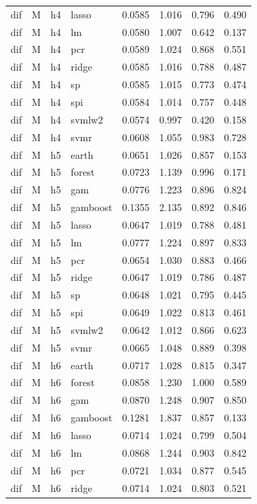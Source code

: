 \begin{ThreePartTable}
\begin{longtable}[t]{llclcccc}
dif & M & h4 & lasso & 0.0585 & 1.016 & 0.796 & 0.490\\
dif & M & h4 & lm & 0.0580 & 1.007 & 0.642 & 0.137\\
dif & M & h4 & pcr & 0.0589 & 1.024 & 0.868 & 0.551\\
dif & M & h4 & ridge & 0.0585 & 1.016 & 0.788 & 0.487\\
dif & M & h4 & sp & 0.0585 & 1.015 & 0.773 & 0.474\\
dif & M & h4 & spi & 0.0584 & 1.014 & 0.757 & 0.448\\
dif & M & h4 & svmlw2 & 0.0574 & 0.997 & 0.420 & 0.158\\
dif & M & h4 & svmr & 0.0608 & 1.055 & 0.983 & 0.728\\
\addlinespace
dif & M & h5 & earth & 0.0651 & 1.026 & 0.857 & 0.153\\
dif & M & h5 & forest & 0.0723 & 1.139 & 0.996 & 0.171\\
dif & M & h5 & gam & 0.0776 & 1.223 & 0.896 & 0.824\\
dif & M & h5 & gamboost & 0.1355 & 2.135 & 0.892 & 0.846\\
dif & M & h5 & lasso & 0.0647 & 1.019 & 0.788 & 0.481\\
dif & M & h5 & lm & 0.0777 & 1.224 & 0.897 & 0.833\\
dif & M & h5 & pcr & 0.0654 & 1.030 & 0.883 & 0.466\\
dif & M & h5 & ridge & 0.0647 & 1.019 & 0.786 & 0.487\\
dif & M & h5 & sp & 0.0648 & 1.021 & 0.795 & 0.445\\
dif & M & h5 & spi & 0.0649 & 1.022 & 0.813 & 0.461\\
dif & M & h5 & svmlw2 & 0.0642 & 1.012 & 0.866 & 0.623\\
dif & M & h5 & svmr & 0.0665 & 1.048 & 0.889 & 0.398\\
\addlinespace
dif & M & h6 & earth & 0.0717 & 1.028 & 0.815 & 0.347\\
dif & M & h6 & forest & 0.0858 & 1.230 & 1.000 & 0.589\\
dif & M & h6 & gam & 0.0870 & 1.248 & 0.907 & 0.850\\
dif & M & h6 & gamboost & 0.1281 & 1.837 & 0.857 & 0.133\\
dif & M & h6 & lasso & 0.0714 & 1.024 & 0.799 & 0.504\\
dif & M & h6 & lm & 0.0868 & 1.244 & 0.903 & 0.842\\
dif & M & h6 & pcr & 0.0721 & 1.034 & 0.877 & 0.545\\
dif & M & h6 & ridge & 0.0714 & 1.024 & 0.803 & 0.521\\

\end{longtable}
\end{ThreePartTable}
